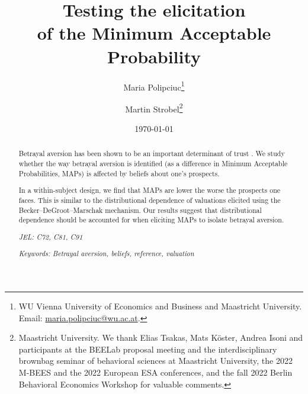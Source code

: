 \makeatletter
\def\@seccntformat#1{\@ifundefined{#1@cntformat}%
   {\csname the#1\endcsname\quad}  %
   {\csname #1@cntformat\endcsname}%
}
\let\oldappendix\appendix %
\renewcommand\appendix{%
    \oldappendix
    \newcommand{\section@cntformat}{\appendixname~\thesection\quad}
}

\usepackage{preliminary}


\title{Testing the elicitation \\ of the Minimum Acceptable Probability}
\author{Maria Polipciuc\thanks{WU Vienna University of Economics and Business and Maastricht University. Email: \url{maria.polipciuc@wu.ac.at}.} \and Martin Strobel\thanks{Maastricht University. We thank Elias Tsakas, Mats K\"{o}ster, Andrea Isoni and participants at the BEELab proposal meeting and the interdisciplinary brownbag seminar of behavioral sciences at Maastricht University, the 2022 M-BEES and the 2022 European ESA conferences, and the fall 2022 Berlin Behavioral Economics Workshop for valuable comments.}}
\date{\today	\vspace{1cm}}
\titlepage



\begin{titlepage}
\clearpage
\maketitle
\thispagestyle{empty}


\begin{abstract}
Betrayal aversion has been shown to be an important determinant of trust \citep{Bohnet2004}.
We study whether the way betrayal aversion is identified (as a difference in Minimum Acceptable Probabilities, MAPs) is affected by beliefs about one’s prospects.

In a within-subject design, we find that MAPs are lower the worse the prospects one faces.
This is similar to the distributional dependence of valuations elicited using the Becker–DeGroot–Marschak mechanism.
Our results suggest that distributional dependence should be accounted for when eliciting MAPs to isolate betrayal aversion.
\medskip

\noindent \textit{JEL: C72, C81, C91}

\noindent  \textit{Keywords: Betrayal aversion, beliefs, reference, valuation}

\end{abstract}
\end{titlepage}


